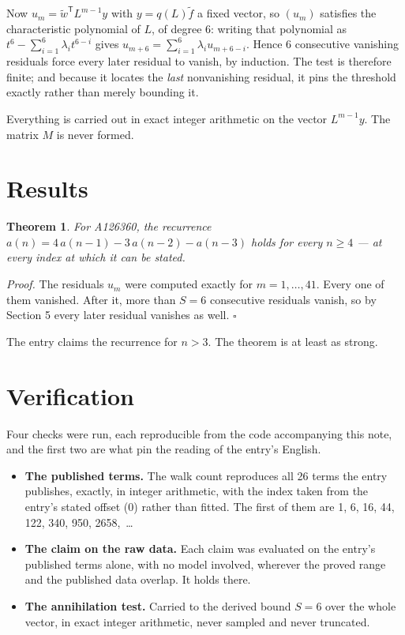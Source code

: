 \documentclass[11pt]{article}
\newtheorem{theorem}{Theorem}
\theoremstyle{definition}
\begin{document}
Now $u_m = \tilde w^{\mathsf T} L^{m-1} y$ with $y = q(L)\tilde f$ a fixed vector, so $(u_m)$ satisfies the characteristic polynomial of $L$, of degree $6$: writing that polynomial as $t^{6} - \sum_{i=1}^{6} \lambda_i t^{6-i}$ gives $u_{m+6} = \sum_{i=1}^{6} \lambda_i u_{m+6-i}$. Hence $6$ consecutive vanishing residuals force every later residual to vanish, by induction. The test is therefore finite; and because it locates the {\itshape last} nonvanishing residual, it pins the threshold exactly rather than merely bounding it.

Everything is carried out in exact integer arithmetic on the vector $L^{m-1}y$. The matrix $M$ is never formed.

\section{Results}

\begin{theorem} For A126360, the recurrence $a(n) = 4\,a(n-1) - 3\,a(n-2) - a(n-3)$ holds for every $n \ge 4$ --- at every index at which it can be stated.\end{theorem}

{\itshape Proof.} The residuals $u_m$ were computed exactly for $m = 1,\dots,41$. Every one of them vanished. After it, more than $S = 6$ consecutive residuals vanish, so by Section 5 every later residual vanishes as well. $\square$

The entry claims the recurrence for $n > 3$. The theorem is at least as strong.

\section{Verification}

Four checks were run, each reproducible from the code accompanying this note, and the first two are what pin the reading of the entry's English.

\begin{itemize}

\item {\bfseries The published terms.} The walk count reproduces all 26 terms the entry publishes, exactly, in integer arithmetic, with the index taken from the entry's stated offset (0) rather than fitted. The first of them are 1, 6, 16, 44, 122, 340, 950, 2658,~\dots

\item {\bfseries The claim on the raw data.} Each claim was evaluated on the entry's published terms alone, with no model involved, wherever the proved range and the published data overlap. It holds there.

\item {\bfseries The annihilation test.} Carried to the derived bound $S = 6$ over the whole vector, in exact integer arithmetic, never sampled and never truncated.

\end{itemize}
\end{document}
